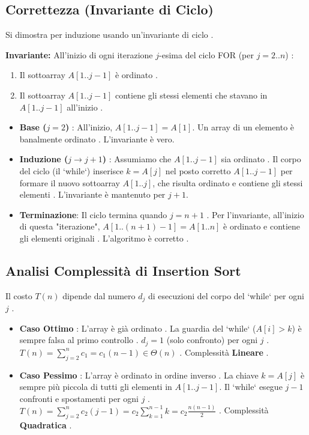 \subsection{Correttezza (Invariante di Ciclo) }
Si dimostra per induzione usando un'invariante di ciclo .
\begin{definition}
\textbf{Invariante:} All'inizio di ogni iterazione $j$-esima del ciclo FOR (per $j=2..n$) :
\begin{enumerate}
    \item Il sottoarray $A[1..j-1]$ è ordinato .
    \item Il sottoarray $A[1..j-1]$ contiene gli stessi elementi che stavano in $A[1..j-1]$ all'inizio .
\end{enumerate}
\begin{itemize}
    \item \textbf{Base ($j=2$)} : All'inizio, $A[1..j-1] = A[1]$. Un array di un elemento è banalmente ordinato . L'invariante è vero.
    \item \textbf{Induzione ($j \to j+1$)} : Assumiamo che $A[1..j-1]$ sia ordinato . Il corpo del ciclo (il `while`) inserisce $k=A[j]$ nel posto corretto $A[1..j-1]$ per formare il nuovo sottoarray $A[1..j]$, che risulta ordinato e contiene gli stessi elementi . L'invariante è mantenuto per $j+1$.
    \item \textbf{Terminazione}: Il ciclo termina quando $j=n+1$ . Per l'invariante, all'inizio di questa "iterazione", $A[1..(n+1)-1] = A[1..n]$ è ordinato e contiene gli elementi originali . L'algoritmo è corretto .
\end{itemize}
\end{definition}

\subsection{Analisi Complessità di Insertion Sort }
Il costo $T(n)$ dipende dal numero $d_j$ di esecuzioni del corpo del `while` per ogni $j$ .
\begin{observation}
\begin{itemize}
    \item \textbf{Caso Ottimo} : L'array è già ordinato .
    La guardia del `while` ($A[i]>k$) è sempre falsa al primo controllo .
    $d_j = 1$ (solo confronto) per ogni $j$ .
    $T(n) = \sum_{j=2}^{n} c_1 = c_1(n-1) \in \Theta(n)$ .
    Complessità \textbf{Lineare} .
    
    \item \textbf{Caso Pessimo} : L'array è ordinato in ordine inverso .
    La chiave $k=A[j]$ è sempre più piccola di tutti gli elementi in $A[1..j-1]$.
    Il `while` esegue $j-1$ confronti e spostamenti per ogni $j$ .
    $T(n) = \sum_{j=2}^{n} c_2(j-1) = c_2 \sum_{k=1}^{n-1} k = c_2 \frac{n(n-1)}{2}$ .
    Complessità \textbf{Quadratica} .
\end{itemize}
\end{observation}

